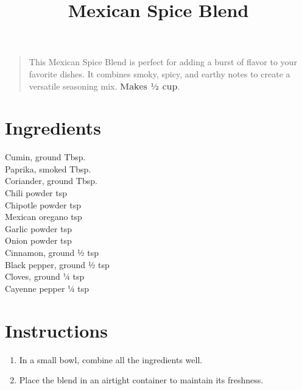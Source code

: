 \documentclass[11pt,letterpaper]{article}
\title{Mexican Spice Blend}
\author{}
\date{}
\begin{document}
\maketitle
\thispagestyle{empty}

\begin{quote}
\small
\begin{em}
This Mexican Spice Blend is perfect for adding a burst of flavor to your favorite dishes. It combines smoky, spicy, and earthy notes to create a versatile seasoning mix. \textbf{Makes ½ cup}.
\end{em}
\end{quote}

\section*{Ingredients}
\setlength{\columnsep}{20pt}
\begin{multicols}{2}
\noindent
    Cumin, ground  Tbsp. \\
    Paprika, smoked  Tbsp. \\
    Coriander, ground  Tbsp. \\
    Chili powder  tsp \\
    Chipotle powder  tsp \\
    Mexican oregano  tsp \\
    Garlic powder  tsp \\
    Onion powder  tsp \\
    Cinnamon, ground \dotfill ½ tsp \\
    Black pepper, ground \dotfill ½ tsp \\
    Cloves, ground \dotfill ¼ tsp \\
    Cayenne pepper \dotfill ¼ tsp
\end{multicols}

\section*{Instructions}

\begin{enumerate}
    \item In a small bowl, combine all the ingredients well.
    \item Place the blend in an airtight container to maintain its freshness.
\end{enumerate}
\end{document}
